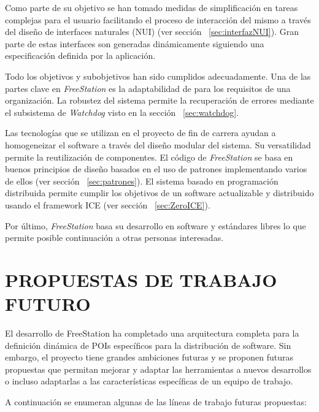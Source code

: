Como parte de su objetivo se han tomado medidas de simplificación en tareas
complejas para el usuario facilitando el proceso de interacción del mismo a
través del diseño de interfaces naturales (NUI) (ver sección
~\ref{sec:interfazNUI}). Gran parte de estas interfaces son generadas
dinámicamente siguiendo una especificación definida por la aplicación.

Todo los objetivos y subobjetivos han sido cumplidos adecuadamente. Una de las
partes clave en \emph{FreeStation} es la adaptabilidad de para los requisitos
de una organización. La robustez del sistema permite la recuperación de errores mediante el
subsistema de \emph{Watchdog} visto en la sección ~\ref{sec:watchdog}.

Las tecnologías que se utilizan en el proyecto de fin de carrera ayudan a
homogeneizar el software a través del diseño modular del sistema. Su
versatilidad permite la reutilización de componentes. El código de 
\emph{FreeStation} se basa en buenos principios de diseño basados en el uso 
de patrones implementando varios de ellos (ver sección ~\ref{sec:patrones}). El
sistema basado en programación distribuida permite cumplir los objetivos de un 
software actualizable y distribuido usando el framework ICE (ver sección
~\ref{sec:ZeroICE}). 

Por último, \emph{FreeStation} basa su desarrollo en software y estándares
libres lo que permite posible continuación a otras personas interesadas.

\newpage

\section{\uppercase{Propuestas de trabajo futuro}}

El desarrollo de FreeStation ha completado una arquitectura completa para la
definición dinámica de POIs específicos para la distribución de software. Sin
embargo, el proyecto tiene grandes ambiciones futuras y se proponen 
futuras propuestas que permitan mejorar y adaptar las herramientas a nuevos
desarrollos o incluso adaptarlas a las características específicas de un equipo
de trabajo.

A continuación se enumeran algunas de las líneas de trabajo futuras propuestas:

